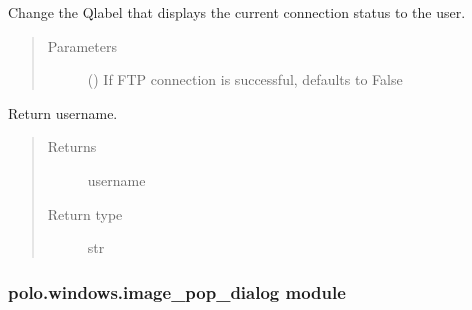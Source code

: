 \documentclass[letterpaper,10pt,english]{sphinxmanual}
\begin{document}
\begin{fulllineitems}
\begin{fulllineitems}
\label{\detokenize{polo.windows:polo.windows.ftp_dialog.FTPDialog.set_connection_status}}
Change the Qlabel that displays the current connection status
to the user.
\begin{quote}\begin{description}
\item[{Parameters}] \leavevmode
{} (\sphinxstyleliteralemphasis{\sphinxupquote{, }}) \textendash{} If FTP connection is successful, defaults to False

\end{description}\end{quote}

\end{fulllineitems}


\begin{fulllineitems}
\label{\detokenize{polo.windows:polo.windows.ftp_dialog.FTPDialog.username}}
Return username.
\begin{quote}\begin{description}
\item[{Returns}] \leavevmode
username

\item[{Return type}] \leavevmode
str

\end{description}\end{quote}

\end{fulllineitems}


\end{fulllineitems}



\subsubsection{polo.windows.image\_pop\_dialog module}
\label{\detokenize{polo.windows:module-polo.windows.image_pop_dialog}}\label{\detokenize{polo.windows:polo-windows-image-pop-dialog-module}}
\end{document}
